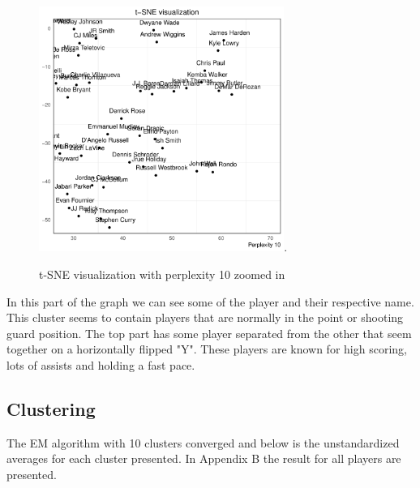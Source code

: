 \documentclass{article}
\begin{document}


 
\begin{figure}[H]
 \centering
 \includegraphics[height=8cm]{zoom10}.
 \caption{t-SNE visualization with perplexity 10 zoomed in}
 \label{figure:2}
\end{figure}

In this part of the graph we can see some of the player and their respective name. This cluster seems to contain players that are normally in the point or shooting guard position. The top part has some player separated from the other that seem together on a horizontally flipped "Y". These players are known for high scoring, lots of assists and holding a fast pace.
 
\newpage 
 
\subsection{Clustering} 

The EM algorithm with 10 clusters converged and below is the unstandardized averages for each cluster presented. In Appendix B the result for all players are presented.
\end{document}
